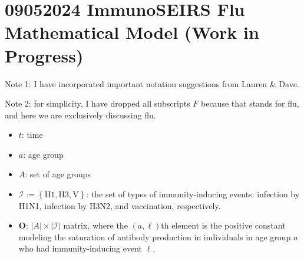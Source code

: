 \documentclass[11pt]{article}
\begin{document}
\addtolength{\jot}{1em}

\section*{09052024 ImmunoSEIRS Flu Mathematical Model (Work in Progress)}

Note 1: I have incorporated important notation suggestions from Lauren \& Dave. \newline

Note 2: for simplicity, I have dropped all subscripts $F$ because that stands for flu, and here we are exclusively discussing flu. 

\begin{itemize}
    \item $t$: time 
    \item $a$: age group 
    \item $A$: set of age groups
    \item $\mathcal I := \left\{\text{H1}, \text{H3}, \text{V}\right\}$: the set of types of immunity-inducing events: infection by H1N1, infection by H3N2, and vaccination, respectively.
    \item $\boldsymbol{O}$: $\lvert A \rvert \times \lvert \mathcal I \rvert$ matrix, where the $(a, \ell)$th element is the positive constant modeling the saturation of antibody production in individuals in age group $a$ who had immunity-inducing event $\ell$.
\end{itemize}
\end{document}
